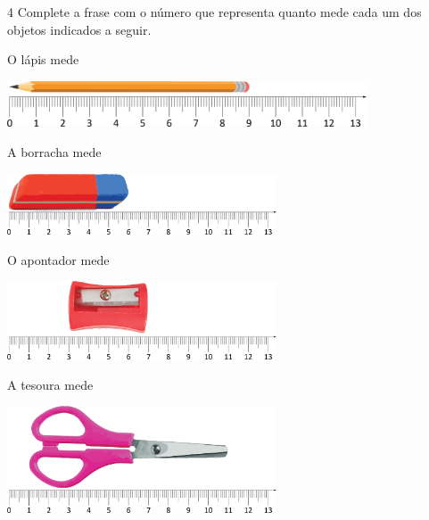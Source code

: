 
\pagebreak

\num{4} Complete a frase com o número que representa quanto mede cada um dos
objetos indicados a seguir.

\begin{escolha}

\item O lápis mede 

\begin{center}
\noindent\includegraphics[width=0.8\textwidth]{./media/image42.png}
\end{center}

\item A borracha mede 

\begin{center}
\noindent\includegraphics[width=0.6\textwidth]{./media/image43.png}
\end{center}

\item O apontador mede 

\begin{center}
\noindent\includegraphics[width=0.6\textwidth]{./media/image44.png}
\end{center}

\item A tesoura mede 

\begin{center}
\noindent\includegraphics[width=0.6\textwidth]{./media/image45.png}
\end{center}
\end{escolha}


